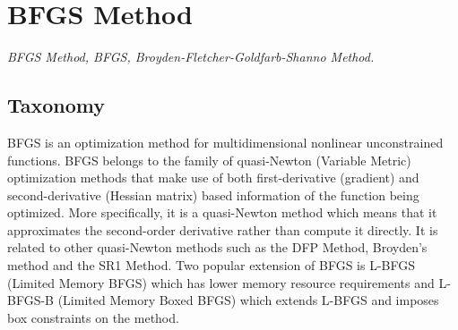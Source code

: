 
\section{BFGS Method} 
\label{sec:bfgs}

\emph{BFGS Method, BFGS, Broyden-Fletcher-Goldfarb-Shanno Method.}

\subsection{Taxonomy}
BFGS is an optimization method for multidimensional nonlinear unconstrained functions.
BFGS belongs to the family of quasi-Newton (Variable Metric) optimization methods that make use of both first-derivative (gradient) and second-derivative (Hessian matrix) based information of the function being optimized. More specifically, it is a quasi-Newton method which means that it approximates the second-order derivative rather than compute it directly. It is related to other quasi-Newton methods such as the DFP Method, Broyden's method and the SR1 Method. 
Two popular extension of BFGS is L-BFGS (Limited Memory BFGS) which has lower memory resource requirements and L-BFGS-B (Limited Memory Boxed BFGS) which extends L-BFGS and imposes box constraints on the method. 

